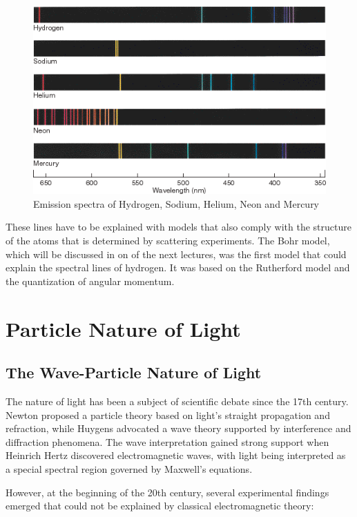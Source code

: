 \documentclass[
  a4paper,
]{book}
\begin{document}
\begin{figure}[H]

{\centering \includegraphics[width=0.7\linewidth,height=\textheight,keepaspectratio]{quantum-mechanics/img/spectra.png}

}

\caption{Emission spectra of Hydrogen, Sodium, Helium, Neon and Mercury}

\end{figure}%

These lines have to be explained with models that also comply with the
structure of the atoms that is determined by scattering experiments. The
Bohr model, which will be discussed in on of the next lectures, was the
first model that could explain the spectral lines of hydrogen. It was
based on the Rutherford model and the quantization of angular momentum.

\chapter{Particle Nature of Light}\label{particle-nature-of-light}

\section{The Wave-Particle Nature of
Light}\label{the-wave-particle-nature-of-light}

The nature of light has been a subject of scientific debate since the
17th century. Newton proposed a particle theory based on light's
straight propagation and refraction, while Huygens advocated a wave
theory supported by interference and diffraction phenomena. The wave
interpretation gained strong support when Heinrich Hertz discovered
electromagnetic waves, with light being interpreted as a special
spectral region governed by Maxwell's equations.

However, at the beginning of the 20th century, several experimental
findings emerged that could not be explained by classical
electromagnetic theory:
\end{document}
